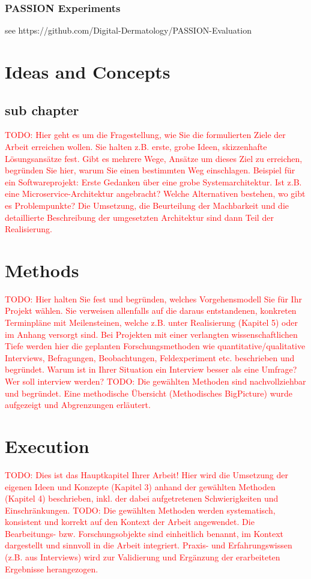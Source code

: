 \documentclass[a4paper,10.5pt,
			   bindingoffset=0.2in,left=3.35cm,right=2.12cm,top=3.75cm,bottom=2.88cm,%
				footskip=.25in
				listof=numbered,toc=chapterentrywithdots]{scrreport}
\renewcommand{\todo}[1]{\textcolor{red}{TODO: #1}}
\begin{document}
			\subsection{PASSION Experiments}
			see https://github.com/Digital-Dermatology/PASSION-Evaluation
			
	
	\chapter{Ideas and Concepts}
	\section{sub chapter}
		\todo{Hier geht es um die Fragestellung, wie Sie die formulierten Ziele der Arbeit erreichen wollen. Sie halten z.B. erste, grobe Ideen, skizzenhafte Lösungsansätze fest. Gibt es mehrere Wege, Ansätze um dieses Ziel zu erreichen, begründen Sie hier, warum Sie einen bestimmten Weg einschlagen. Beispiel für ein Softwareprojekt: Erste Gedanken über eine grobe Systemarchitektur. Ist z.B. eine Microservice-Architektur angebracht? Welche Alternativen bestehen, wo gibt es Problempunkte? Die Umsetzung, die Beurteilung der Machbarkeit und die detaillierte Beschreibung der umgesetzten Architektur sind dann Teil der Realisierung.}
	
	\chapter{Methods}
		\todo{Hier halten Sie fest und begründen, welches Vorgehensmodell Sie für Ihr Projekt wählen. Sie verweisen allenfalls auf die daraus entstandenen, konkreten Terminpläne mit Meilensteinen, welche z.B. unter Realisierung (Kapitel 5) oder im Anhang versorgt sind. Bei Projekten mit einer verlangten wissenschaftlichen Tiefe werden hier die geplanten Forschungsmethoden wie quantitative/qualitative Interviews, Befragungen, Beobachtungen, Feldexperiment etc. beschrieben und begründet. Warum ist in Ihrer Situation ein Interview besser als eine Umfrage? Wer soll interview werden?}
		\todo{Die gewählten Methoden sind nachvollziehbar und begründet. Eine methodische Übersicht (Methodisches BigPicture) wurde aufgezeigt und Abgrenzungen erläutert.}
	
	\chapter{Execution}
		\todo{Dies ist das Hauptkapitel Ihrer Arbeit! Hier wird die Umsetzung der eigenen Ideen und Konzepte (Kapitel 3) anhand der gewählten Methoden (Kapitel 4) beschrieben, inkl. der dabei aufgetretenen Schwierigkeiten und Einschränkungen.}
		\todo{Die gewählten Methoden werden systematisch, konsistent und korrekt auf den Kontext der Arbeit angewendet. Die Bearbeitungs- bzw. Forschungsobjekte sind einheitlich benannt, im Kontext dargestellt und sinnvoll in die Arbeit integriert. Praxis- und Erfahrungswissen (z.B. aus Interviews) wird zur Validierung und Ergänzung der erarbeiteten Ergebnisse herangezogen. }
	
\end{document}
